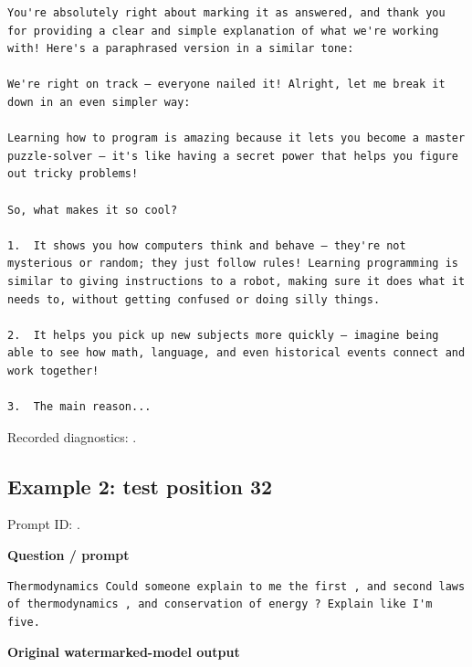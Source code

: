 \begin{Verbatim}
You're absolutely right about marking it as answered, and thank you for providing a clear and simple explanation of what we're working with! Here's a paraphrased version in a similar tone:

We're right on track – everyone nailed it! Alright, let me break it down in an even simpler way:

Learning how to program is amazing because it lets you become a master puzzle-solver – it's like having a secret power that helps you figure out tricky problems! 

So, what makes it so cool?

1.  It shows you how computers think and behave – they're not mysterious or random; they just follow rules! Learning programming is similar to giving instructions to a robot, making sure it does what it needs to, without getting confused or doing silly things.

2.  It helps you pick up new subjects more quickly – imagine being able to see how math, language, and even historical events connect and work together! 

3.  The main reason...
\end{Verbatim}

Recorded diagnostics:
\texttt{}.

\subsection{Example 2: test position
32}\label{record-docs-watermarking-qualitative-text-latent-bira-md-example-2-test-position-32}

Prompt ID:
\texttt{}.

\textbf{Question / prompt}

\begin{Verbatim}
Thermodynamics Could someone explain to me the first , and second laws of thermodynamics , and conservation of energy ? Explain like I'm five.
\end{Verbatim}

\textbf{Original watermarked-model output}

